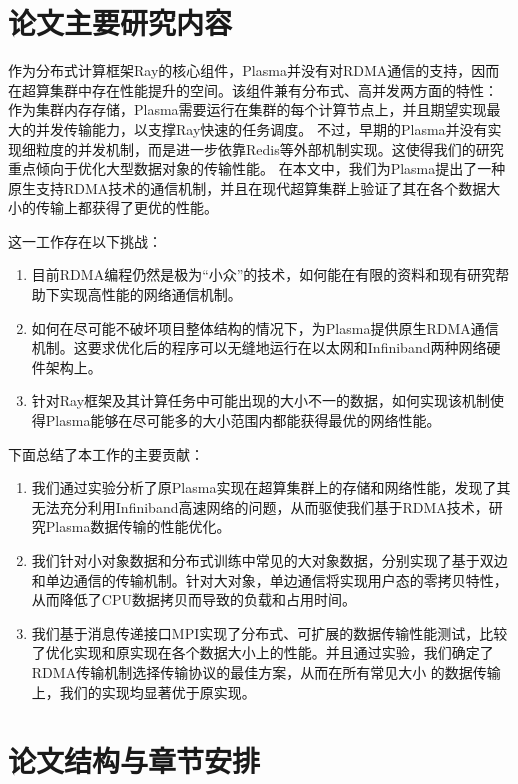 \section{论文主要研究内容}

作为分布式计算框架Ray的核心组件，Plasma并没有对RDMA通信的支持，因而在超算集群中存在性能提升的空间。该组件兼有分布式、高并发两方面的特性：
作为集群内存存储，Plasma需要运行在集群的每个计算节点上，并且期望实现最大的并发传输能力，以支撑Ray快速的任务调度。
不过，早期的Plasma并没有实现细粒度的并发机制，而是进一步依靠Redis等外部机制实现。这使得我们的研究重点倾向于优化大型数据对象的传输性能。
在本文中，我们为Plasma提出了一种原生支持RDMA技术的通信机制，并且在现代超算集群上验证了其在各个数据大小的传输上都获得了更优的性能。

这一工作存在以下挑战：

\begin{enumerate}
	\item 目前RDMA编程仍然是极为“小众”的技术，如何能在有限的资料和现有研究帮助下实现高性能的网络通信机制。
	\item 如何在尽可能不破坏项目整体结构的情况下，为Plasma提供原生RDMA通信机制。这要求优化后的程序可以无缝地运行在以太网和Infiniband两种网络硬件架构上。
	\item 针对Ray框架及其计算任务中可能出现的大小不一的数据，如何实现该机制使得Plasma能够在尽可能多的大小范围内都能获得最优的网络性能。
\end{enumerate}

下面总结了本工作的主要贡献：

\begin{enumerate}
	\item 我们通过实验分析了原Plasma实现在超算集群上的存储和网络性能，发现了其无法充分利用Infiniband高速网络的问题，从而驱使我们基于RDMA技术，研究Plasma数据传输的性能优化。
	\item 我们针对小对象数据和分布式训练中常见的大对象数据，分别实现了基于双边和单边通信的传输机制。针对大对象，单边通信将实现用户态的零拷贝特性，从而降低了CPU数据拷贝而导致的负载和占用时间。
	\item 我们基于消息传递接口MPI实现了分布式、可扩展的数据传输性能测试，比较了优化实现和原实现在各个数据大小上的性能。并且通过实验，我们确定了RDMA传输机制选择传输协议的最佳方案，从而在所有常见大小
	的数据传输上，我们的实现均显著优于原实现。
\end{enumerate}

\section{论文结构与章节安排}
\label{sec:arrangement}

